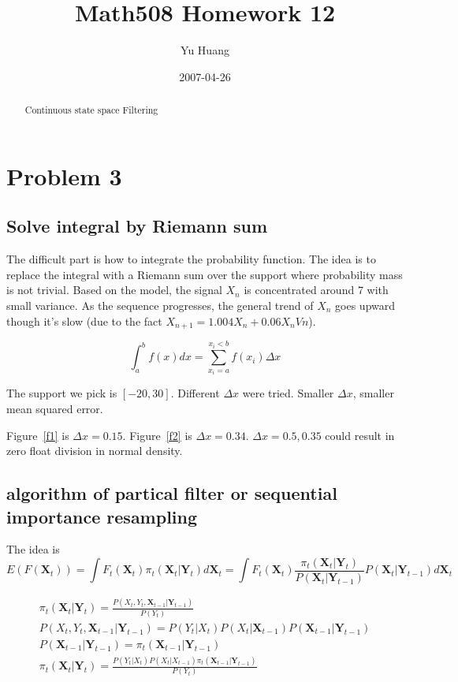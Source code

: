 \documentclass[a4paper,10pt]{article}
\title{Math508 Homework 12}
\author{Yu Huang}
\date{2007-04-26}
\begin{document}
\maketitle

\begin{abstract}
Continuous state space Filtering
\end{abstract}

\section{Problem 3}
\subsection{Solve integral by Riemann sum}
The difficult part is how to integrate the probability function. The idea is to replace the integral with a Riemann sum over the support where probability mass is not trivial. Based on the model, the signal $X_n$ is concentrated around 7 with small variance. As the sequence progresses, the general trend of $X_n$ goes upward though it's slow (due to the fact $X_{n+1} = 1.004X_n + 0.06X_nVn$).

\begin{equation}
\int_a^b f(x) dx = \sum_{x_i=a}^{x_i<b} f(x_i) \Delta x
\end{equation}


The support we pick is $[-20, 30]$. Different $\Delta x$ were tried. Smaller $\Delta x$, smaller mean squared error.


Figure~\ref{f1} is $\Delta x=0.15$. Figure~\ref{f2} is $\Delta x=0.34$. $\Delta x=0.5, 0.35$ could result in zero float division in normal density.


\subsection{algorithm of partical filter or sequential importance resampling}
The idea is 
\begin{equation}
E(F(\mathbf{X}_t)) = \int F_t(\mathbf{X}_t) \pi_t(\mathbf{X}_t|\mathbf{Y}_t) d\mathbf{X}_t = \int F_t(\mathbf{X}_t) \frac{\pi_t(\mathbf{X}_t|\mathbf{Y}_t)}{P(\mathbf{X}_t|\mathbf{Y}_{t-1})} P(\mathbf{X}_t|\mathbf{Y}_{t-1}) d\mathbf{X}_t
\end{equation}


\begin{eqnarray}
\pi_t(\mathbf{X}_t|\mathbf{Y}_t) = \frac{P(X_t, Y_t, \mathbf{X}_{t-1}|\mathbf{Y}_{t-1})}{P(Y_t)} \\
P(X_t, Y_t, \mathbf{X}_{t-1}|\mathbf{Y}_{t-1}) = P(Y_t|X_t)P(X_t|\mathbf{X}_{t-1})P(\mathbf{X}_{t-1}|\mathbf{Y}_{t-1}) \\
P(\mathbf{X}_{t-1}|\mathbf{Y}_{t-1}) = \pi_t(\mathbf{X}_{t-1}|\mathbf{Y}_{t-1}) \\
\pi_t(\mathbf{X}_t|\mathbf{Y}_t) = \frac{P(Y_t|X_t)P(X_t|X_{t-1})\pi_t(\mathbf{X}_{t-1}|\mathbf{Y}_{t-1})}{P(Y_t)}
\end{eqnarray}
\end{document}
